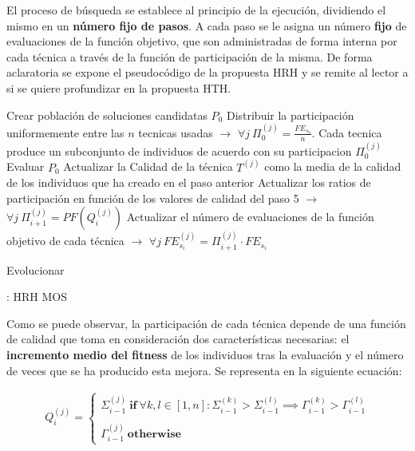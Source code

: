 El proceso de búsqueda se establece al principio de la ejecución, dividiendo el mismo en un \textbf{número fijo de pasos}. A cada paso se le asigna un número \textbf{fijo} de evaluaciones de la función objetivo, que son administradas de forma interna por cada técnica a través de la función de participación de la misma. De forma aclaratoria se expone el pseudocódigo de la propuesta HRH y se remite al lector a \cite{MOS2010} si se quiere profundizar en la propuesta HTH.

\begin{algorithm}[H]
	\begin{algorithmic}[1]
		\STATE Crear población de soluciones candidatas $P_0$
		\STATE Distribuir la participación uniformemente entre las $n$ tecnicas usadas $\rightarrow$ $\forall j \ \Pi_{0}^{(j)} = \frac{FE_{s_{0}}}{n}$. Cada tecnica produce un subconjunto de individuos de acuerdo con su participacion $ \Pi_{0}^{(j)}$
		\STATE Evaluar $P_0$
		\STATE Actualizar la Calidad de la técnica $T^{(j)}$ como la media de la calidad de los individuos que ha creado en el paso anterior
		\STATE Actualizar los ratios de participación en función de los valores de calidad del paso 5 $\rightarrow$ $\forall j \ \Pi_{i+1}^{(j)} = PF(Q_i^{(j)})$
		\STATE Actualizar el número de evaluaciones de la función objetivo de cada técnica $\rightarrow$ $\forall j \ FE_{s_i}^{(j)} = \Pi_{i+1}^{(j)} \cdot FE_{s_i}$		
		
				\STATE Evolucionar
			\ENDWHILE
		\ENDFOR
		\ENDWHILE		
	\end{algorithmic}
	\caption{: HRH MOS }
\end{algorithm}

Como se puede observar, la participación de cada técnica depende de una función de calidad que toma en consideración dos características necesarias: el \textbf{incremento medio del fitness} de los individuos tras la evaluación y el número de veces que se ha producido esta mejora. Se representa en la siguiente ecuación:

\begin{equation}\label{eq:QF_MOS}
	\begin{gathered}
		Q_i^{(j)} = 
						\begin{cases}
							\Sigma_{i-1}^{(j)} \ \textbf{if}  \ \forall k,l \in [1,n]: \Sigma_{i-1}^{(k)} > \Sigma_{i-1}^{(l)} \implies \Gamma_{i-1}^{(k)} > \Gamma_{i-1}^{(l)} \\ \\
							\Gamma_{i-1}^{(j)} \ \textbf{otherwise}
						\end{cases}
	\end{gathered}
\end{equation}


